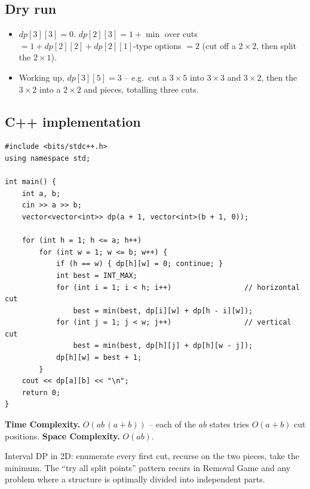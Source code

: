 \subsection*{Dry run}


\begin{itemize}
  \item $\textit{dp}[3][3]=0$. $\textit{dp}[2][3]=1+\min$ over cuts
        $=1+\textit{dp}[2][2]+\textit{dp}[2][1]$-type options $=2$ (cut
        off a $2\times2$, then split the $2\times1$).
  \item Working up, $\textit{dp}[3][5]=3$ -- e.g.\ cut a $3\times5$ into
        $3\times3$ and $3\times2$, then the $3\times2$ into a $2\times2$
        and pieces, totalling three cuts.
\end{itemize}

\subsection*{C++ implementation}

\begin{lstlisting}
#include <bits/stdc++.h>
using namespace std;

int main() {
    int a, b;
    cin >> a >> b;
    vector<vector<int>> dp(a + 1, vector<int>(b + 1, 0));

    for (int h = 1; h <= a; h++)
        for (int w = 1; w <= b; w++) {
            if (h == w) { dp[h][w] = 0; continue; }
            int best = INT_MAX;
            for (int i = 1; i < h; i++)                 // horizontal cut
                best = min(best, dp[i][w] + dp[h - i][w]);
            for (int j = 1; j < w; j++)                 // vertical cut
                best = min(best, dp[h][j] + dp[h][w - j]);
            dp[h][w] = best + 1;
        }
    cout << dp[a][b] << "\n";
    return 0;
}
\end{lstlisting}

\begin{complexitybox}
\textbf{Time Complexity.} $O(ab\,(a+b))$ -- each of the $ab$ states tries
$O(a+b)$ cut positions. \textbf{Space Complexity.} $O(ab)$.
\end{complexitybox}

\begin{takeawaybox}
Interval DP in 2D: enumerate every first cut, recurse on the two pieces,
take the minimum. The ``try all split points'' pattern recurs in Removal
Game and any problem where a structure is optimally divided into
independent parts.
\end{takeawaybox}
